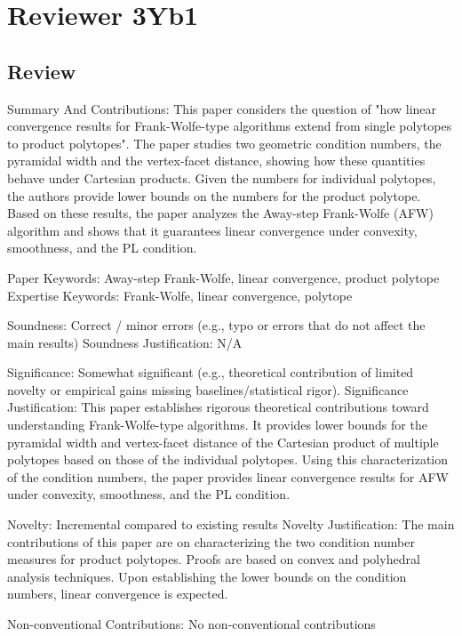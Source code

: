 \documentclass[a4wide]{article}
\begin{document}
\section*{Reviewer 3Yb1}

\subsection*{Review}
Summary And Contributions:
This paper considers the question of "how linear convergence results for Frank-Wolfe-type algorithms extend from single polytopes to product polytopes". The paper studies two geometric condition numbers, the pyramidal width and the vertex-facet distance, showing how these quantities behave under Cartesian products. Given the numbers for individual polytopes, the authors provide lower bounds on the numbers for the product polytope. Based on these results, the paper analyzes the Away-step Frank-Wolfe (AFW) algorithm and shows that it guarantees linear convergence under convexity, smoothness, and the PL condition.

Paper Keywords: Away-step Frank-Wolfe, linear convergence, product polytope
Expertise Keywords: Frank-Wolfe, linear convergence, polytope

Soundness: Correct / minor errors (e.g., typo or errors that do not affect the main results)
Soundness Justification: N/A

Significance: Somewhat significant (e.g., theoretical contribution of limited novelty or empirical gains missing baselines/statistical rigor).
Significance Justification:
This paper establishes rigorous theoretical contributions toward understanding Frank-Wolfe-type algorithms. It provides lower bounds for the pyramidal width and vertex-facet distance of the Cartesian product of multiple polytopes based on those of the individual polytopes. Using this characterization of the condition numbers, the paper provides linear convergence results for AFW under convexity, smoothness, and the PL condition.

Novelty: Incremental compared to existing results
Novelty Justification:
The main contributions of this paper are on characterizing the two condition number measures for product polytopes. Proofs are based on convex and polyhedral analysis techniques. Upon establishing the lower bounds on the condition numbers, linear convergence is expected.

Non-conventional Contributions:
No non-conventional contributions
\end{document}
